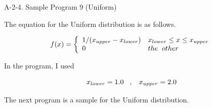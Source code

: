 \clearpage

\noindent
{\Large A-2-4. Sample Program 9 (Uniform)}

\vspace*{7mm}

\noindent
The equation for the Uniform distribution is as follows.

\begin{equation}
f(x) = \left\{
\begin{array}{ll}
1 / ( x_{upper} - x_{lower} )  & x_{lower} \le x \le x_{upper} \\
0 & the \hspace{2mm} other
\end{array}
\right.
\end{equation}

\noindent
In the program, I used

\begin{equation}
x_{lower} = 1.0 \hspace{3mm} , \hspace{3mm} x_{upper} = 2.0
\end{equation}

\vspace*{5mm}

\noindent
The next program is a sample for the Uniform distribution.

\vspace*{10mm}

